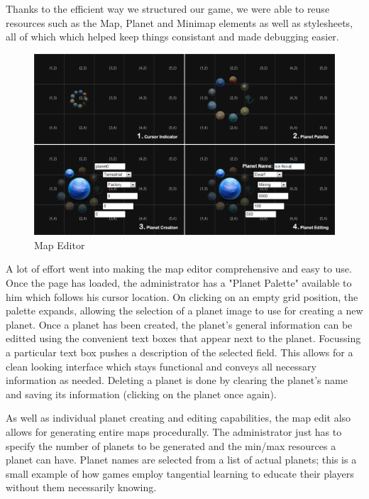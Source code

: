 \documentclass[a4paper,11pt]{article}
\begin{document}
		Thanks to the efficient way we structured our game, we were able to reuse resources such as the Map, Planet and Minimap elements as well as stylesheets, all of which which helped keep things consistant and made debugging easier.
		
		\begin{figure}[htb]
		\begin{center}
		\leavevmode
		\includegraphics[scale=0.6]{mapedit.png}
		\end{center}
		\caption{Map Editor}
		\label{fig:mapedit}
		\end{figure}

		A lot of effort went into making the map editor comprehensive and easy to use. Once the page has loaded, the administrator has a "Planet Palette" available to him which follows his cursor location. On clicking on an empty grid position, the palette expands, allowing the selection of a planet image to use for creating a new planet. Once a planet has been created, the planet's general information can be editted using the convenient text boxes that appear next to the planet. Focussing a particular text box pushes a description of the selected field. This allows for a clean looking interface which stays functional and conveys all necessary information as needed. Deleting a planet is done by clearing the planet's name and saving its information (clicking on the planet once again).

		As well as individual planet creating and editing capabilities, the map edit also allows for generating entire maps procedurally. The administrator just has to specify the number of planets to be generated and the min/max resources a planet can have. Planet names are selected from a list of actual planets; this is a small example of how games employ tangential learning to educate their players without them necessarily knowing.
\end{document}
